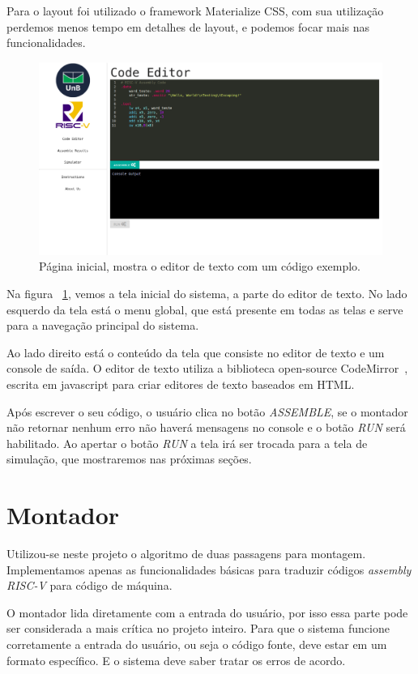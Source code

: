 	Para o layout foi utilizado o framework Materialize CSS, com sua utilização perdemos menos tempo em detalhes de layout, e podemos focar mais nas funcionalidades.

	\begin{figure}[h]
	  \includegraphics[width=\linewidth]{img/code_editor.png}
	  \caption{Página inicial, mostra o editor de texto com um código exemplo.}
	  \label{fig:editor_texto}
	\end{figure}

	Na figura ~\ref{fig:editor_texto}, vemos a tela inicial do sistema, a parte do editor de texto. No lado esquerdo da tela está o menu global, que está presente em todas as telas e serve para a navegação principal do sistema.

	Ao lado direito está o conteúdo da tela que consiste no editor de texto e um console de saída. O editor de texto utiliza a biblioteca open-source CodeMirror~\cite{codemirror}, escrita em javascript para criar editores de texto baseados em HTML.

	Após escrever o seu código, o usuário clica no botão \textit{ASSEMBLE}, se o montador não retornar nenhum erro não haverá mensagens no console e o botão \textit{RUN} será habilitado. Ao apertar o botão \textit{RUN} a tela irá ser trocada para a tela de simulação, que mostraremos nas próximas seções.

	
\section{Montador}
	
	Utilizou-se neste projeto o algoritmo de duas passagens para montagem. Implementamos apenas as funcionalidades básicas para traduzir códigos \textit{assembly RISC-V} para código de máquina.

	O montador lida diretamente com a entrada do usuário, por isso essa parte pode ser considerada a mais crítica no projeto inteiro. Para que o sistema funcione corretamente a entrada do usuário, ou seja o código fonte, deve estar em um formato específico. E o sistema deve saber tratar os erros de acordo. 

